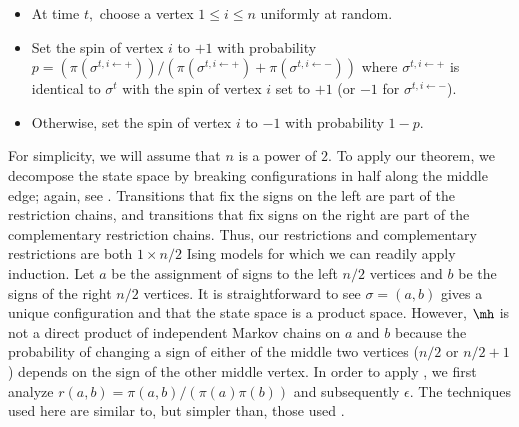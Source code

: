 \vspace{.05in}
\begin{itemize}
\item At time $t,$ choose a vertex $1\leq i \leq n$ uniformly at random.  
\item Set the spin of vertex $i$ to $+1$ with probability $p = (\pi(\sigma^{t, i \leftarrow +}))/(\pi(\sigma^{t, i \leftarrow +})+ \pi(\sigma^{t, i \leftarrow -}))$ where $\sigma^{t, i \leftarrow +}$ is identical to $\sigma^t$ with the spin of vertex $i$ set to $+1$ (or $-1$ for $\sigma^{t, i \leftarrow -}$).
\item Otherwise, set the spin of vertex $i$ to $-1$ with probability $1-p.$
\end{itemize}

\noindent For simplicity, we will assume that $n$ is a power of $2$. To 
apply our theorem, we decompose the state space by breaking 
configurations in half along the middle edge; again, see 
.  Transitions that fix the signs on the left are 
part of the restriction chains, and transitions that fix signs on the 
right are part of the complementary restriction chains.  Thus, our 
restrictions and complementary restrictions are both $1 \times n/2$ 
Ising models for which we can readily apply induction.  Let $a$ be the 
assignment of signs to the left $n/2$ vertices and $b$ be the signs of 
the right $n/2$ vertices.  It is straightforward to see $\sigma = 
(a,b)$ gives a unique configuration and that the state space is a 
product space.  However, $\mh$ is not a direct product of independent 
Markov chains on $a$ and $b$ because the probability of changing a sign 
of either of the middle two vertices ($n/2$ or $n/2+1$) depends on the 
sign of the other middle vertex. In order to apply 
, we first analyze $r(a,b) = \pi(a,b)/ 
(\pi(a)\pi(b))$ and subsequently $\epsilon$.  The techniques used here 
are similar to, but simpler than, those used . 

